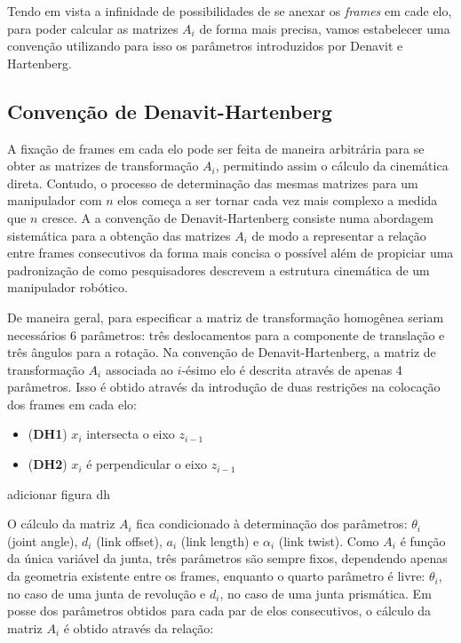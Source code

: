 Tendo em vista a infinidade de possibilidades de se anexar os \emph{frames} em
cade elo, para poder calcular as matrizes $A_i$ de forma mais precisa, vamos
estabelecer uma convenção utilizando para isso os parâmetros introduzidos por
Denavit e Hartenberg.

\subsection{Convenção de Denavit-Hartenberg}

A fixação de frames em cada elo pode ser feita de maneira arbitrária para se
obter as matrizes de transformação $A_i$, permitindo assim o cálculo da
cinemática direta. Contudo, o processo de determinação das mesmas matrizes para
um manipulador com $n$ elos começa a ser tornar cada vez mais complexo a medida
que $n$ cresce. A a convenção de Denavit-Hartenberg consiste numa abordagem
sistemática para a obtenção das matrizes $A_i$ de modo a representar a relação
entre frames consecutivos da forma mais concisa o possível além de propiciar
uma padronização de como pesquisadores descrevem a estrutura cinemática de um
manipulador robótico.

De maneira geral, para especificar a matriz de transformação homogênea seriam
necessários 6 parâmetros: três deslocamentos para a componente de translação e
três ângulos para a rotação. Na convenção de Denavit-Hartenberg, a matriz de
transformação $A_i$ associada ao $i$-ésimo elo é descrita através de apenas 4
parâmetros. Isso é obtido através da introdução de duas restrições na colocação
dos frames em cada elo:

\begin{itemize}
    \item (\textbf{DH1}) $x_i$ intersecta o eixo $z_{i-1}$
    \item (\textbf{DH2}) $x_i$ é perpendicular o eixo $z_{i-1}$
\end{itemize}

adicionar figura dh

O cálculo da matriz $A_i$ fica condicionado à determinação dos parâmetros:
$\theta_i$ (joint angle), $d_i$ (link offset), $a_i$ (link length) e $\alpha_i$
(link twist). Como $A_i$ é função da única variável da junta, três parâmetros
são sempre fixos, dependendo apenas da geometria existente entre os frames,
enquanto o quarto parâmetro é livre: $\theta_i$, no caso de uma junta de
revolução e $d_i$, no caso de uma junta prismática. Em posse dos parâmetros
obtidos para cada par de elos consecutivos, o cálculo da matriz $A_i$ é obtido
através da relação:

